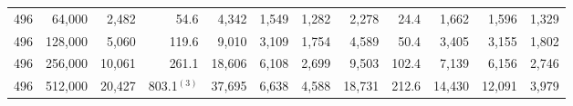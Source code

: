 \begin{table}[!htbp]
\begin{tabular}{rr rrrrr rrrrr}
496 & 64,000 & 2,482 & 54.6 & 4,342 & 1,549 & 1,282 & 2,278 & 24.4 & 1,662 & 1,596 & 1,329 \\
496 & 128,000 & 5,060 & 119.6 & 9,010 & 3,109 & 1,754 & 4,589 & 50.4 & 3,405 & 3,155 & 1,802 \\
496 & 256,000 & 10,061 & 261.1 & 18,606 & 6,108 & 2,699 & 9,503 & 102.4 & 7,139 & 6,156 & 2,746 \\
496 & 512,000 & 20,427 & 803.1$^{(3)}$ & 37,695 & 6,638 & 4,588 & 18,731 & 212.6 & 14,430 & 12,091 & 3,979 \\
\bottomrule
\end{tabular}
\end{table}